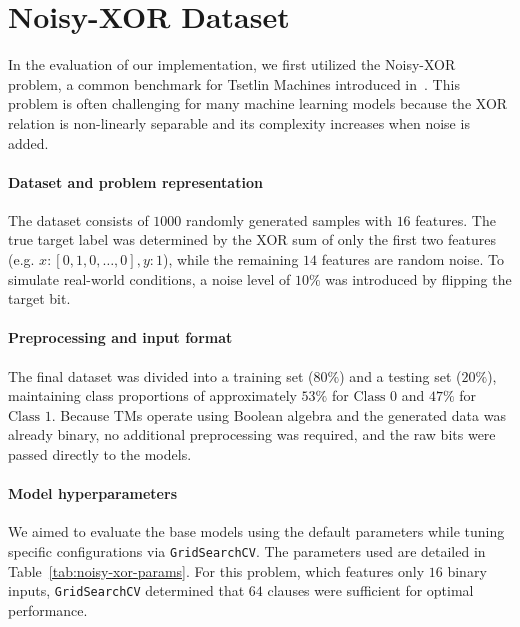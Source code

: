 \clearpage
\section{Noisy-XOR Dataset}
In the evaluation of our implementation, we first utilized the Noisy-XOR problem, a common benchmark for Tsetlin Machines introduced in~\cite{granmo2021tsetlinmachinegame}. This problem is often challenging for many machine learning models because the XOR relation is non-linearly separable and its complexity increases when noise is added.

\paragraph{Dataset and problem representation}
The dataset consists of $1000$ randomly generated samples with $16$ features. The true target label was determined by the XOR sum of only the first two features (e.g. $x: [0,1,0,\dots,0], y: 1$), while the remaining $14$ features are random noise. To simulate real-world conditions, a noise level of $10\%$ was introduced by flipping the target bit.

\paragraph{Preprocessing and input format}
The final dataset was divided into a training set ($80\%$) and a testing set ($20\%$), maintaining class proportions of approximately $53\%$ for $\text{Class } 0$ and $47\%$ for $\text{Class } 1$. Because TMs operate using Boolean algebra and the generated data was already binary, no additional preprocessing was required, and the raw bits were passed directly to the models.

\paragraph{Model hyperparameters}
We aimed to evaluate the base models using the default parameters while tuning specific configurations via \texttt{GridSearchCV}. The parameters used are detailed in Table~\ref{tab:noisy-xor-params}. For this problem, which features only $16$ binary inputs, \texttt{GridSearchCV} determined that $64$ clauses were sufficient for optimal performance.

